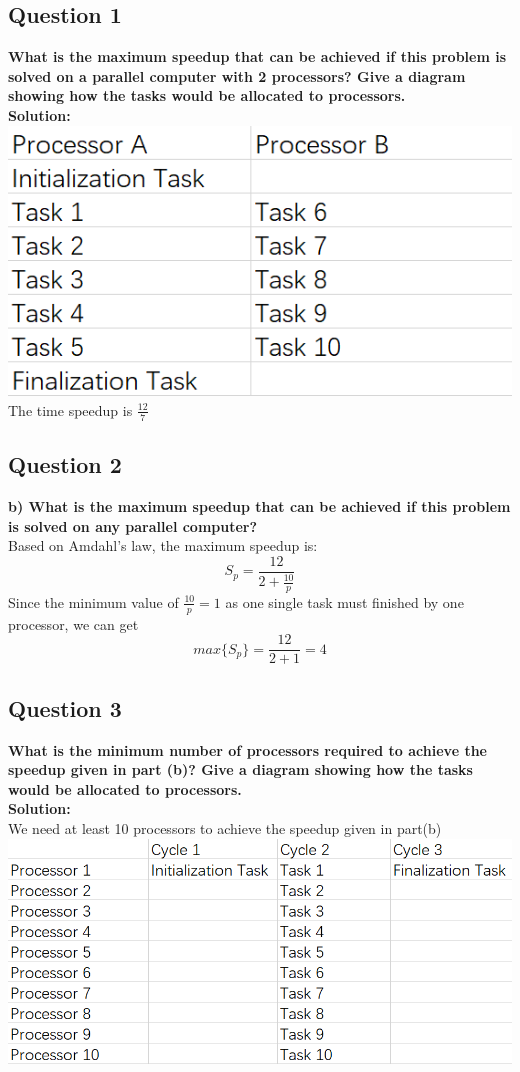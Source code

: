 \documentclass{article}
\begin{document}
\subsection{Question 1}
\textcolor[rgb]{0,0,1}{\textbf{What is the maximum speedup that can be achieved if this problem is 
solved on a parallel computer with 2 processors? Give a diagram showing how the tasks would be allocated to processors.}}\\
\textbf{Solution: }\\
\includegraphics[scale=0.5]{list2.png}\\
The time speedup is $\frac{12}{7}$
\subsection{Question 2}
\textcolor[rgb]{0,0,1}{\textbf{b) What is the maximum speedup that can be achieved if this problem is 
solved on any parallel computer?}}\\
Based on Amdahl's law, the maximum speedup is:
$$S_{p} = \frac{12}{2+\frac{10}{p}}$$
Since the minimum value of $\frac{10}{p} = 1$ as one single task must finished by one processor, we can get
$$max\{S_{p}\} = \frac{12}{2+1} = 4$$
\subsection{Question 3}
\textcolor[rgb]{0,0,1}{\textbf{What is the minimum number of processors required to achieve the 
speedup given in part (b)? Give a diagram showing how the tasks would 
be allocated to processors. }}\\
\textbf{Solution: }\\
We need at least 10 processors to achieve the speedup given in part(b)\\
\includegraphics[scale=0.5]{list3.png}
\end{document}
